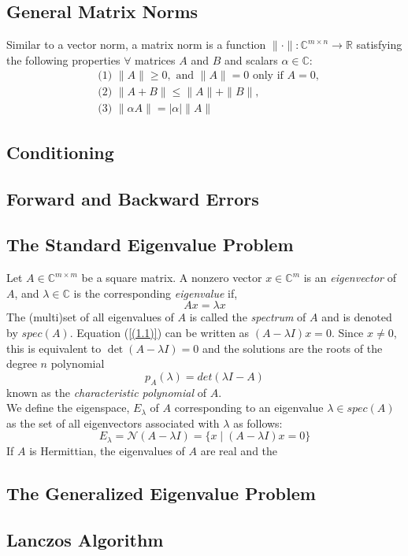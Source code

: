 \subsection{General Matrix Norms}
Similar to a vector norm, a matrix norm is a function  $ \| \cdot \| : \mathbb{C}^{m\times n} \rightarrow \mathbb{R} $ satisfying the following properties $\forall$ matrices $A$ and $B$ and scalars $\alpha \in \mathbb{C}$:
\begin{align*}
	&\text{(1) } \| A \| \geq 0, \text{ and } \| A \| = 0 \text{ only if } A = 0,\\
	&\text{(2) } \| A+B \| \leq \| A \| + \| B \|,\\
	&\text{(3) } \| \alpha A \| = |\alpha| \| A \|
\end{align*}
\subsection{Conditioning}
\subsection{Forward and Backward Errors}
\subsection{The Standard Eigenvalue Problem}
Let $A \in \mathbb{C}^{m\times m}$ be a square matrix. A nonzero vector $x \in \mathbb{C}^m$ is an \textit{eigenvector} of $A$, and $\lambda \in \mathbb{C}$ is the corresponding \textit{eigenvalue} if,
\begin{equation}\label{(1.1)}
	Ax = \lambda x
\end{equation}
The (multi)set of all eigenvalues of $A$ is called the \textit{spectrum} of $A$ and is denoted by $spec(A)$. Equation (\ref{(1.1)}) can be written as $(A-\lambda I)x = 0$. Since $x\neq0$, this is equivalent to $\det(A-\lambda I) = 0$ and the solutions are the roots of the degree $n$ polynomial
\begin{equation}
	p_A (\lambda) = det(\lambda I - A)
\end{equation}
known as the \textit{characteristic polynomial} of $A$.\\
We define the eigenspace, $E_\lambda$ of $A$ corresponding to an eigenvalue $\lambda \in spec(A)$ as the set of all eigenvectors associated with $\lambda$ as follows:
\begin{equation}
	E_\lambda = \mathcal{N}(A-\lambda I) = \{x \mid (A - \lambda I)x = 0\}
\end{equation}
If $A$ is Hermittian, the eigenvalues of $A$ are real and the 
\subsection{The Generalized Eigenvalue Problem}

\subsection{Lanczos Algorithm}
 
